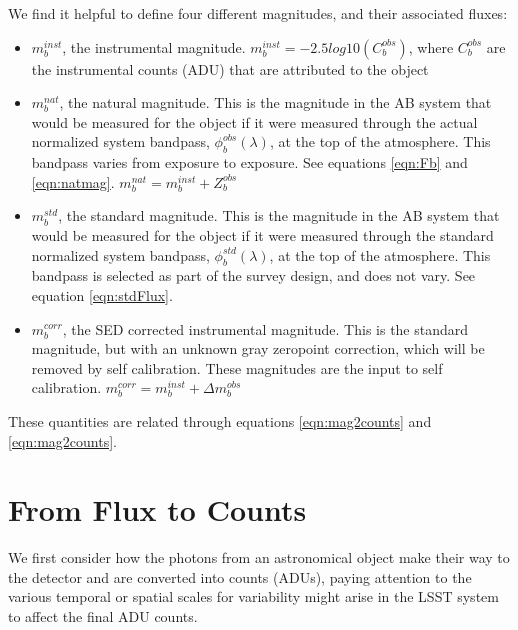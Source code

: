 \documentclass[12pt,preprint]{aastex}
\begin{document}
\begin{boxedminipage}{6.5in}
We find it helpful to define four different magnitudes, and their associated fluxes:
\begin{itemize}
\item{$m_b^{inst}$, the instrumental magnitude.  $m_b^{inst} = -2.5 log10(C_b^{obs})$, where $C_b^{obs}$ are the instrumental counts (ADU) that are attributed to the object}
\item{$m_b^{nat}$, the natural magnitude.  This is the magnitude in the AB system that would be measured for the object if it were measured through the actual normalized system bandpass, $\phi_b^{obs}(\lambda)$, at the top of the atmosphere.  This bandpass varies
from exposure to exposure.  See equations \ref{eqn:Fb} and \ref{eqn:natmag}. $m_b^{nat} = m_b^{inst} + Z_b^{obs}$}
\item{$m_b^{std}$}, the standard magnitude.  This is the magnitude in the AB system that would be measured for the object if it were measured through the standard normalized system bandpass, $\phi_b^{std}(\lambda)$, at the top of the atmosphere.  This bandpass is 
selected as part of the survey design, and does not vary.  See equation \ref{eqn:stdFlux}. 
\item{$m_b^{corr}$, the SED corrected instrumental magnitude.  This is the standard magnitude, but with an unknown gray zeropoint correction, which will be removed by self calibration.  These magnitudes are the input to self calibration. $m_b^{corr} = m_b^{inst} + \Delta m_b^{obs}$}
\end{itemize}
These quantities are related through equations \ref{eqn:mag2counts} and \ref{eqn:mag2counts}.
\end{boxedminipage}

\section{From Flux to Counts}

We first consider how the photons from an astronomical object make their
way to the detector and are converted into counts (ADUs), paying attention to the various
temporal or spatial scales for variability might arise in the LSST
system to affect the final ADU counts. 
\end{document}
